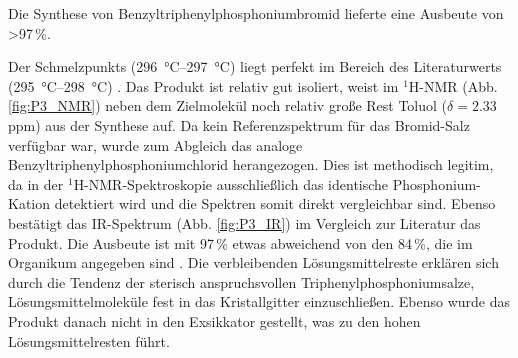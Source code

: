 Die Synthese von Benzyltriphenylphosphoniumbromid lieferte eine Ausbeute von >97\,\%. 

Der Schmelzpunkts (\SI{296}{\degreeCelsius}--\SI{297}{\degreeCelsius}) liegt perfekt im Bereich des Literaturwerts (\SI{295}{\degreeCelsius}--\SI{298}{\degreeCelsius}) \cite{ORG}. 
Das Produkt ist relativ gut isoliert, weist im $^1$H-NMR (Abb. \ref{fig:P3_NMR}) neben dem Zielmolekül noch relativ große Rest Toluol ($\delta = 2.33$ ppm) aus der Synthese auf. 
Da kein Referenzspektrum für das Bromid-Salz verfügbar war, wurde zum Abgleich das analoge Benzyltriphenylphosphoniumchlorid \cite{CB} herangezogen.
Dies ist methodisch legitim, da in der $^1$H-NMR-Spektroskopie ausschließlich das identische Phosphonium-Kation detektiert wird und die Spektren somit direkt vergleichbar sind. 
Ebenso bestätigt das IR-Spektrum (Abb. \ref{fig:P3_IR}) im Vergleich zur Literatur \cite{SA} das Produkt.
Die Ausbeute ist mit 97\,\% etwas abweichend von den 84\,\%, die im Organikum angegeben sind \cite{ORG}. Die verbleibenden Lösungsmittelreste erklären sich durch die Tendenz der sterisch anspruchsvollen Triphenylphosphoniumsalze, Lösungsmittelmoleküle fest in das Kristallgitter einzuschließen. 
Ebenso wurde das Produkt danach nicht in den Exsikkator gestellt, was zu den hohen Lösungsmittelresten führt. 